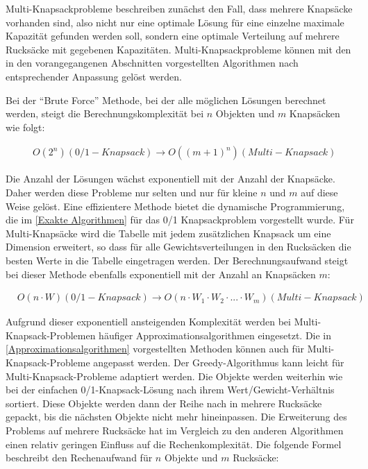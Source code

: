Multi-Knapsackprobleme beschreiben zunächst den Fall, dass mehrere Knapsäcke vorhanden sind, also nicht nur eine optimale Lösung für eine einzelne maximale Kapazität gefunden werden soll, sondern eine optimale Verteilung auf mehrere Rucksäcke mit gegebenen Kapazitäten. Multi-Knapsackprobleme können mit den in den vorangegangenen Abschnitten vorgestellten Algorithmen nach entsprechender Anpassung gelöst werden.

Bei der \enquote{Brute Force} Methode, bei der alle möglichen Lösungen berechnet werden, steigt die Berechnungskomplexität bei $ n $ Objekten und $ m $ Knapsäcken wie folgt:

\begin{align}
    & O(2^n) (0/1-Knapsack) \rightarrow O((m+1)^n) (Multi-Knapsack)
\end{align}

Die Anzahl der Lösungen wächst exponentiell mit der Anzahl der Knapsäcke. Daher werden diese Probleme nur selten und nur für kleine $ n $ und $ m $ auf diese Weise gelöst. Eine effizientere Methode bietet die dynamische Programmierung, die im \autoref{Exakte Algorithmen} für das 0/1 Knapsackproblem vorgestellt wurde. Für Multi-Knapsäcke wird die Tabelle mit jedem zusätzlichen Knapsack um eine Dimension erweitert, so dass für alle Gewichtsverteilungen in den Rucksäcken die besten Werte in die Tabelle eingetragen werden. Der Berechnungsaufwand steigt bei dieser Methode ebenfalls exponentiell mit der Anzahl an Knapsäcken $ m $:

\begin{align}
    & O(n \cdot W) (0/1-Knapsack) \rightarrow O(n \cdot W_1 \cdot W_2 \cdot ... \cdot W_m) (Multi-Knapsack)
\end{align}

Aufgrund dieser exponentiell ansteigenden Komplexität werden bei Multi-Knapsack-Problemen häufiger Approximationsalgorithmen eingesetzt. Die in \autoref{Approximationsalgorithmen} vorgestellten Methoden können auch für Multi-Knapsack-Probleme angepasst werden. Der Greedy-Algorithmus kann leicht für Multi-Knapsack-Probleme adaptiert werden. Die Objekte werden weiterhin wie bei der einfachen 0/1-Knapsack-Lösung nach ihrem Wert/Gewicht-Verhältnis sortiert. Diese Objekte werden dann der Reihe nach in mehrere Rucksäcke gepackt, bis die nächsten Objekte nicht mehr hineinpassen. Die Erweiterung des Problems auf mehrere Rucksäcke hat im Vergleich zu den anderen Algorithmen einen relativ geringen Einfluss auf die Rechenkomplexität. Die folgende Formel beschreibt den Rechenaufwand für $ n $ Objekte und $ m $ Rucksäcke:

